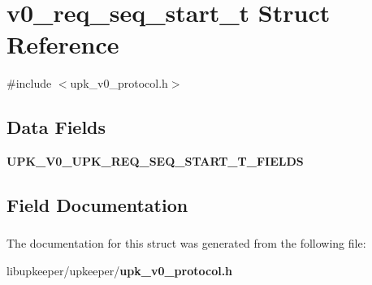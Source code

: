\section{v0\_\-req\_\-seq\_\-start\_\-t Struct Reference}
\label{structv0__req__seq__start__t}


{\ttfamily \#include $<$upk\_\-v0\_\-protocol.h$>$}

\subsection*{Data Fields}
\begin{DoxyCompactItemize}
\item 
{\bf UPK\_\-V0\_\-UPK\_\-REQ\_\-SEQ\_\-START\_\-T\_\-FIELDS}
\end{DoxyCompactItemize}


\subsection{Field Documentation}
\subsubsection[{UPK\_\-V0\_\-UPK\_\-REQ\_\-SEQ\_\-START\_\-T\_\-FIELDS}]{}\label{structv0__req__seq__start__t_a43d6cb1c655a3c707a1a089cd952c2ed}


The documentation for this struct was generated from the following file:\begin{DoxyCompactItemize}
\item 
libupkeeper/upkeeper/{\bf upk\_\-v0\_\-protocol.h}\end{DoxyCompactItemize}
